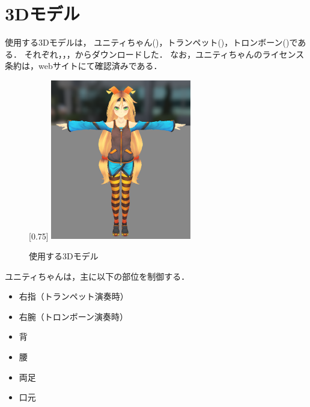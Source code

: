 \section{3Dモデル} \label{sec:3Dmodel}
使用する3Dモデルは，
ユニティちゃん()，トランペット()，トロンボーン()である．
それぞれ，\cite{unity}，\cite{tp}，\cite{tb}からダウンロードした．
なお，ユニティちゃんのライセンス条約は，webサイト\cite{license}にて確認済みである．
\begin{figure}[h]
	\centering
	[0.75\linewidth]{
		\includegraphics[height=7cm]{fig/chap3/unity.eps}}
	\caption{使用する3Dモデル}
	\label{fig:model}
\end{figure}
\newpage
\indent
ユニティちゃんは，主に以下の部位を制御する．
\begin{itemize}
	\item 右指（トランペット演奏時）
	\item 右腕（トロンボーン演奏時）
	\item 背
	\item 腰
	\item 両足
	\item 口元
\end{itemize}
